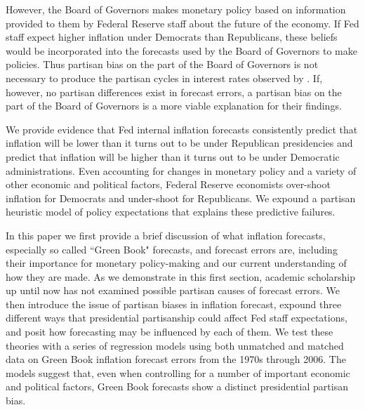 \documentclass[a4paper]{article}
\begin{document}


However, the Board of Governors makes monetary policy based on information provided to them by Federal Reserve staff about the future of the economy. If Fed staff expect higher inflation under Democrats than Republicans, these beliefs would be incorporated into the forecasts used by the Board of Governors to make policies. Thus partisan bias on the part of the Board of Governors is not necessary to produce the partisan cycles in interest rates observed by \cite{Clark2012}. If, however, no partisan differences exist in forecast errors, a partisan bias on the part of the Board of Governors is a more viable explanation for their findings.

We provide evidence that Fed internal inflation forecasts consistently predict that inflation will be lower than it turns out to be under Republican presidencies and predict that inflation will be higher than it turns out to be under Democratic administrations. Even accounting for changes in monetary policy and a variety of other economic and political factors, Federal Reserve economists over-shoot inflation for Democrats and under-shoot for Republicans. We expound a partisan heuristic model of policy expectations that explains these predictive failures.

In this paper we first provide a brief discussion of what inflation forecasts, especially so called ``Green Book" forecasts, and forecast errors are, including their importance for monetary policy-making and our current understanding of how they are made. As we demonstrate in this first section, academic scholarship up until now has not examined possible partisan causes of forecast errors. We then introduce the issue of partisan biases in inflation forecast, expound three different ways that presidential partisanship could affect Fed staff expectations, and posit how forecasting may be influenced by each of them. We test these theories with a series of regression models using both unmatched and matched data on Green Book inflation forecast errors from the 1970s through 2006. The models suggest that, even when controlling for a number of important economic and political factors, Green Book forecasts show a distinct presidential partisan bias. 
\end{document}
